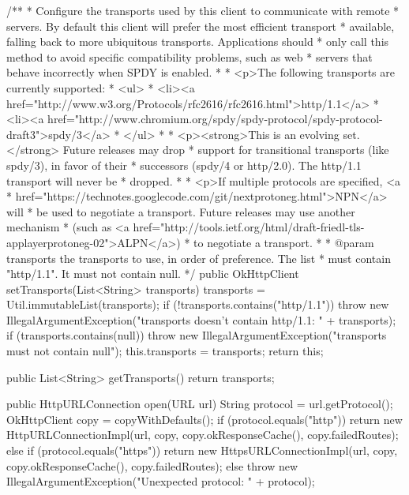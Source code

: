 \begin{prompt}
{{{{{{{{  /**
   * Configure the transports used by this client to communicate with remote
   * servers. By default this client will prefer the most efficient transport
   * available, falling back to more ubiquitous transports. Applications should
   * only call this method to avoid specific compatibility problems, such as web
   * servers that behave incorrectly when SPDY is enabled.
   *
   * <p>The following transports are currently supported:
   * <ul>
   *   <li><a href="http://www.w3.org/Protocols/rfc2616/rfc2616.html">http/1.1</a>
   *   <li><a href="http://www.chromium.org/spdy/spdy-protocol/spdy-protocol-draft3">spdy/3</a>
   * </ul>
   *
   * <p><strong>This is an evolving set.</strong> Future releases may drop
   * support for transitional transports (like spdy/3), in favor of their
   * successors (spdy/4 or http/2.0). The http/1.1 transport will never be
   * dropped.
   *
   * <p>If multiple protocols are specified, <a
   * href="https://technotes.googlecode.com/git/nextprotoneg.html">NPN</a> will
   * be used to negotiate a transport. Future releases may use another mechanism
   * (such as <a href="http://tools.ietf.org/html/draft-friedl-tls-applayerprotoneg-02">ALPN</a>)
   * to negotiate a transport.
   *
   * @param transports the transports to use, in order of preference. The list
   *     must contain "http/1.1". It must not contain null.
   */
  public OkHttpClient setTransports(List<String> transports) {
    transports = Util.immutableList(transports);
    if (!transports.contains("http/1.1")) {
      throw new IllegalArgumentException("transports doesn't contain http/1.1: " + transports);
    }
    if (transports.contains(null)) {
      throw new IllegalArgumentException("transports must not contain null");
    }
    this.transports = transports;
    return this;
  }

  public List<String> getTransports() {
    return transports;
  }

  public HttpURLConnection open(URL url) {
    String protocol = url.getProtocol();
    OkHttpClient copy = copyWithDefaults();
    if (protocol.equals("http")) {
      return new HttpURLConnectionImpl(url, copy, copy.okResponseCache(), copy.failedRoutes);
    } else if (protocol.equals("https")) {
      return new HttpsURLConnectionImpl(url, copy, copy.okResponseCache(), copy.failedRoutes);
    } else {
      throw new IllegalArgumentException("Unexpected protocol: " + protocol);
    }
  }

}}}}}}}}
\end{prompt}
